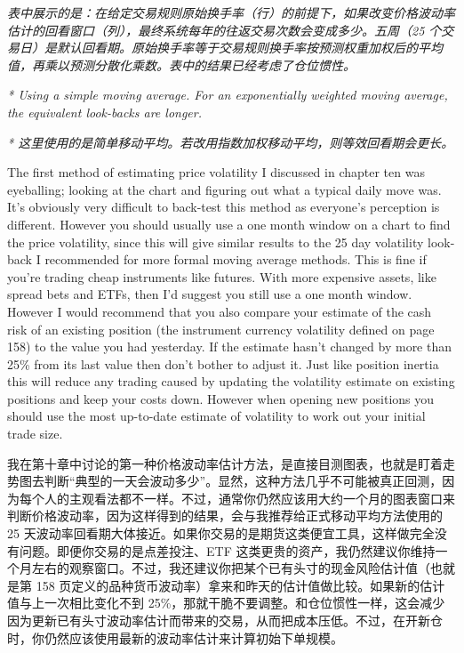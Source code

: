 \smallskip \noindent\textit{表中展示的是：在给定交易规则原始换手率（行）的前提下，如果改变价格波动率估计的回看窗口（列），最终系统每年的往返交易次数会变成多少。五周（25 个交易日）是默认回看期。原始换手率等于交易规则换手率按预测权重加权后的平均值，再乘以预测分散化乘数。表中的结果已经考虑了仓位惯性。}

\smallskip \noindent\textit{* Using a simple moving average. For an exponentially weighted moving average, the equivalent look-backs are longer.}

\smallskip \noindent\textit{* 这里使用的是简单移动平均。若改用指数加权移动平均，则等效回看期会更长。}


\begin{englishblock} The first method of estimating price volatility I discussed in chapter ten was eyeballing; looking at the chart and figuring out what a typical daily move was. It's obviously very difficult to back-test this method as everyone's perception is different. However you should usually use a one month window on a chart to find the price volatility, since this will give similar results to the 25 day volatility look-back I recommended for more formal moving average methods. This is fine if you're trading cheap instruments like futures. With more expensive assets, like spread bets and ETFs, then I'd suggest you still use a one month window. However I would recommend that you also compare your estimate of the cash risk of an existing position (the instrument currency volatility defined on page 158) to the value you had yesterday. If the estimate hasn't changed by more than 25\% from its last value then don't bother to adjust it. Just like position inertia this will reduce any trading caused by updating the volatility estimate on existing positions and keep your costs down. However when opening new positions you should use the most up-to-date estimate of volatility to work out your initial trade size. \end{englishblock}

\begin{chineseblock}我在第十章中讨论的第一种价格波动率估计方法，是直接目测图表，也就是盯着走势图去判断“典型的一天会波动多少”。显然，这种方法几乎不可能被真正回测，因为每个人的主观看法都不一样。不过，通常你仍然应该用大约一个月的图表窗口来判断价格波动率，因为这样得到的结果，会与我推荐给正式移动平均方法使用的 25 天波动率回看期大体接近。如果你交易的是期货这类便宜工具，这样做完全没有问题。即便你交易的是点差投注、ETF 这类更贵的资产，我仍然建议你维持一个月左右的观察窗口。不过，我还建议你把某个已有头寸的现金风险估计值（也就是第 158 页定义的品种货币波动率）拿来和昨天的估计值做比较。如果新的估计值与上一次相比变化不到 25\%，那就干脆不要调整。和仓位惯性一样，这会减少因为更新已有头寸波动率估计而带来的交易，从而把成本压低。不过，在开新仓时，你仍然应该使用最新的波动率估计来计算初始下单规模。\end{chineseblock}


